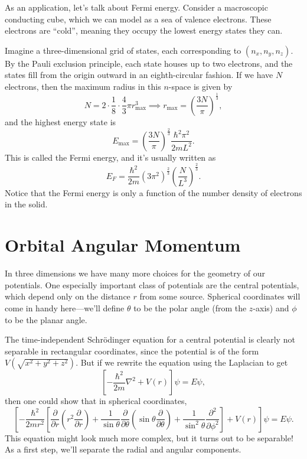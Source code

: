 \documentclass[../p052main.tex]{subfiles}
\begin{document}
As an application, let's talk about Fermi energy.
Consider a macroscopic conducting cube, which we can model as a sea of valence electrons.
These electrons are ``cold'', meaning they occupy the lowest energy states they can.

Imagine a three-dimensional grid of states, each corresponding to $(n_x, n_y, n_z)$.
By the Pauli exclusion principle, each state houses up to two electrons, and the states fill from the origin outward in an eighth-circular fashion.
If we have $N$ electrons, then the maximum radius in this $n$-space is given by
\[ N = 2 \cdot \frac{1}{8} \cdot \frac{4}{3} \pi r_\textrm{max}^3 \implies r_\textrm{max} = \left( \frac{3N}{\pi} \right)^{\frac{1}{3}}, \]
and the highest energy state is
\[ E_\textrm{max} = \left( \frac{3N}{\pi} \right)^{\frac{2}{3}} \frac{\hbar^2 \pi^2}{2mL^2}. \]
This is called the Fermi energy, and it's usually written as
\[ E_F = \frac{\hbar^2}{2m} \left( 3\pi^2 \right)^{\frac{2}{3}} \left( \frac{N}{L^3} \right)^{\frac{2}{3}}. \]
Notice that the Fermi energy is only a function of the number density of electrons in the solid.

\section{Orbital Angular Momentum} %
In three dimensions we have many more choices for the geometry of our potentials.
One especially important class of potentials are the central potentials, which depend only on the distance $r$ from some source.
Spherical coordinates will come in handy here---we'll define $\theta$ to be the polar angle (from the $z$-axis) and $\phi$ to be the planar angle.

The time-independent Schrödinger equation for a central potential is clearly not separable in rectangular coordinates, since the potential is of the form $V(\sqrt{x^2 + y^2 + z^2})$.
But if we rewrite the equation using the Laplacian to get
\[ \left[ -\frac{\hbar^2}{2m} \nabla^2 + V(r) \right] \psi = E\psi, \]
then one could show that in spherical coordinates,
\[ \left[ -\frac{\hbar^2}{2mr^2} \left[ \frac{\partial}{\partial r} \left( r^2 \frac{\partial}{\partial r} \right) + \frac{1}{\sin \theta} \frac{\partial}{\partial \theta} \left( \sin \theta \frac{\partial}{\partial \theta} \right) + \frac{1}{\sin^2 \theta} \frac{\partial^2}{\partial \phi^2} \right] + V(r) \right] \psi = E \psi. \]
This equation might look much more complex, but it turns out to be separable!
As a first step, we'll separate the radial and angular components.
\end{document}
